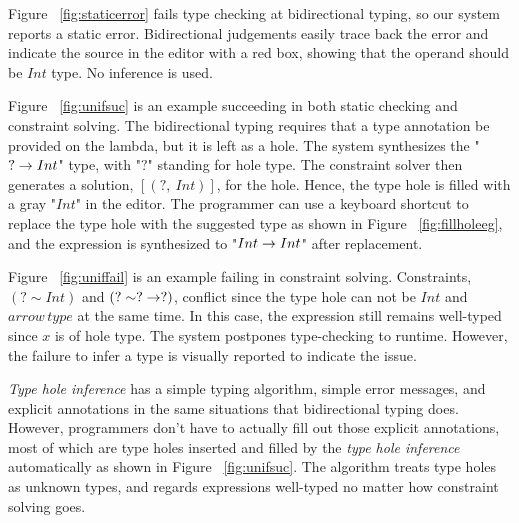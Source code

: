 \par Figure ~\ref{fig:staticerror} fails type checking at bidirectional typing, so our system reports a static error. Bidirectional judgements easily trace back the error and indicate the source in the editor with a red box, showing that the operand should be $Int$ type. No inference is used.\par 
Figure ~\ref{fig:unifsuc} is an example succeeding in both static checking and constraint solving.  The bidirectional typing requires that a type annotation be provided on the lambda, but it is left as a hole. The system synthesizes the "$? \rightarrow Int$" type, with "$?$" standing for hole type. The constraint solver then generates a solution, $[(?,~ Int)]$, for the hole. Hence, the type hole is filled with a gray "$Int$" in the editor. The programmer can use a keyboard shortcut to replace the type hole with the suggested type as shown in Figure ~\ref{fig:fillholeeg}, and the expression is synthesized to "$Int \rightarrow Int$" after replacement. \par

Figure ~\ref{fig:uniffail} is an example failing in constraint solving. Constraints, $(? \sim Int)$ and $(? \sim ? \rightarrow ?)$, conflict since the type hole can not be $Int$ and $arrow \, type$ at the same time. In this case, the expression still remains well-typed since $x$ is of hole type. The system postpones type-checking to runtime. However, the failure to infer a type is visually reported to indicate the issue.

\emph{Type hole inference} has a simple typing algorithm, simple error messages, and explicit annotations in the same situations that bidirectional typing does. However, programmers don't have to actually fill out those explicit annotations, most of which are type holes inserted and filled by the \emph{type hole inference} automatically as shown in Figure ~\ref{fig:unifsuc}. The algorithm treats type holes as unknown types, and regards expressions well-typed no matter how constraint solving goes. 


